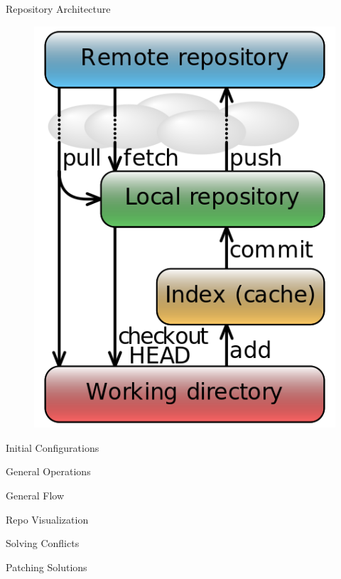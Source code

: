 \documentclass{workshop}
\begin{document}
\begin{frame}{Repository Architecture}
\begin{figure}
  \includegraphics[scale=0.3]{img/flow.png}
\end{figure}
\end{frame}

\begin{frame}{Initial Configurations}
\end{frame}

\begin{frame}{General Operations}
\end{frame}

\begin{frame}{General Flow}
\end{frame}

\begin{frame}{Repo Visualization}
\end{frame}

\begin{frame}{Solving Conflicts}
\end{frame}

\begin{frame}{Patching Solutions}
\end{frame}
\end{document}
